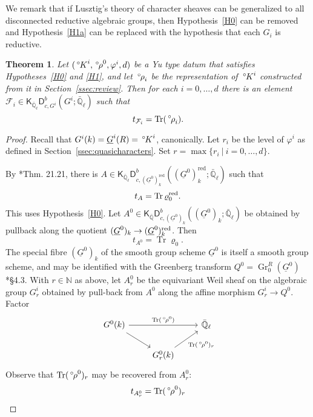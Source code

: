 \documentclass[10pt]{amsart}
\theoremstyle{plain}
\newtheorem{theorem}{Theorem}[section]
\theoremstyle{definition}
\newcommand{\NN}{{\mathbb{N}}}
\newcommand{\QQ}{{\mathbb{Q}}}
\newcommand{\EE}{\mathbb{\bar Q}_\ell}
\newcommand{\bFq}{\bar{k}}
\newcommand{\Fq}{k}
\DeclareMathOperator{\Gr}{Gr}
\DeclareMathOperator{\trace}{Tr}
\newcommand{\tq}{{\ \vert\ }}
\newcommand{\trFrob}[1]{t_{#1}}
\newcommand{\cs}[1]{{\mathcal{#1}}}
\newcommand{\red}{^{\operatorname{red}}}
\newcommand{\oK}{{\,^\circ \hskip-1pt K}}
\newcommand{\orho}{{\,^\circ \hskip-1pt \rho}}
\begin{document}
We remark that if Lusztig's theory of character sheaves can be generalized to all disconnected reductive algebraic groups, then Hypothesis~\ref{H0} can be removed and Hypothesis~\ref{H1a} can be replaced with the hypothesis that each $G_i$ is reductive.

\begin{theorem}\label{thm:geotypes}
Let $(\oK^i, \orho^0, \varphi^i,d)$ be a Yu type datum that satisfies Hypotheses~\ref{H0} and \ref{H1}, and let $\orho_i$ be the representation of $\oK^i$ constructed from it in Section~\ref{ssec:review}.  Then for each $i=0,\dots, d$ there is an element $\cs{F}_i \in \mathsf{K}_{\EE}\mathsf{D}^b_{c,G^i}(G^i;\EE)$ such that
\[
\trFrob{\cs{F}_i} = \trace(\orho_i).
\]
\end{theorem}

\begin{proof}
Recall that $G^i(\Fq) = \underline{G}^i(R) = \oK^i$, canonically.
Let $r_i$ be the level of $\varphi^i$ as defined in Section~\ref{ssec:quasicharacters}. 
Set $r = \max\{ r_i \tq i=0, \ldots ,d\}$.

By \cite{lusztig:disconnected4}*{Thm. 21.21}, there is $A \in \mathsf{K}_{\EE}\mathsf{D}^b_{c,(\underline{G}^0)_\Fq\red}((\underline{G}^0)_\Fq\red;\EE)$ such that 
\[
\trFrob{A} = \trace \varrho_0^\reductive.
\]
This uses Hypothesis~\ref{H0}.
%
Let $A^0\in \mathsf{K}_{\bar\QQ}\mathsf{D}^b_{c,(\underline{G}^0)_\Fq}((\underline{G}^0)_\Fq;\EE)$ be obtained by pullback along the quotient $(\underline{G}^0)_\Fq \to (\underline{G}^0)_\Fq^\reductive$.
Then 
\[
\trFrob{A^0} = \trace \varrho_0.
\]
The special fibre $(\underline{G}^0)_\Fq$ of the smooth group scheme $\underline{G}^0$ is itself a smooth group scheme, and may be identified with the Greenberg transform $Q^0 = \Gr^{R}_0(\underline{G}^0)$ \cite{cunningham-roe:13a}*{\S 4.3}. 
With $r\in \NN$ as above, let ${A}_r^0$ be the equivariant Weil sheaf on the algebraic group $G_r^i$ obtained by pull-back from $A^0$ along the affine morphism $G_r^i \to Q^0$.
Factor
\begin{equation}\label{eqn:tracerho}
\begin{tikzcd}
G^0(\Fq) \arrow{rr}{\trace(\orho^0)} \arrow{rd} && \EE \\
& G_r^0(\Fq) \arrow{ru}[swap]{\trace(\orho^0)_r} 
\end{tikzcd}
\end{equation}
Observe that $\trace(\orho^0)_r$ may be recovered from ${A}_r^0$:
\[
\trFrob{{A}^0_r} = \trace(\orho^0)_r
\]


\end{proof}
\end{document}

